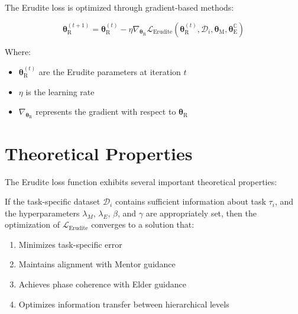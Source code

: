 The Erudite loss is optimized through gradient-based methods:

\begin{equation}
\boldsymbol{\theta}_{\textrm{R}}^{(t+1)} = \boldsymbol{\theta}_{\textrm{R}}^{(t)} - \eta \nabla_{\boldsymbol{\theta}_{\textrm{R}}} \mathcal{L}_{\textrm{Erudite}}(\boldsymbol{\theta}_{\textrm{R}}^{(t)}, \mathcal{D}_i, \boldsymbol{\theta}_{\textrm{M}}, \boldsymbol{\theta}_{\textrm{E}}^{\mathbb{C}})
\end{equation}

Where:
\begin{itemize}
    \item $\boldsymbol{\theta}_{\textrm{R}}^{(t)}$ are the Erudite parameters at iteration $t$
    \item $\eta$ is the learning rate
    \item $\nabla_{\boldsymbol{\theta}_{\textrm{R}}}$ represents the gradient with respect to $\boldsymbol{\theta}_{\textrm{R}}$
\end{itemize}

\section{Theoretical Properties}

The Erudite loss function exhibits several important theoretical properties:

\begin{theorem}
If the task-specific dataset $\mathcal{D}_i$ contains sufficient information about task $\tau_i$, and the hyperparameters $\lambda_M$, $\lambda_E$, $\beta$, and $\gamma$ are appropriately set, then the optimization of $\mathcal{L}_{\textrm{Erudite}}$ converges to a solution that:
\begin{enumerate}
    \item Minimizes task-specific error
    \item Maintains alignment with Mentor guidance
    \item Achieves phase coherence with Elder guidance 
    \item Optimizes information transfer between hierarchical levels
\end{enumerate}
\end{theorem}

